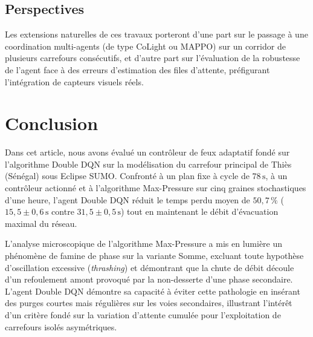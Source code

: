 \documentclass[11pt,a4paper]{article}
\begin{document}
\subsection{Perspectives}
Les extensions naturelles de ces travaux porteront d'une part sur le passage à une coordination multi-agents (de type CoLight ou MAPPO) sur un corridor de plusieurs carrefours consécutifs, et d'autre part sur l'évaluation de la robustesse de l'agent face à des erreurs d'estimation des files d'attente, préfigurant l'intégration de capteurs visuels réels.

\section{Conclusion}
\label{sec:conclusion}

Dans cet article, nous avons évalué un contrôleur de feux adaptatif fondé sur l'algorithme Double DQN sur la modélisation du carrefour principal de Thiès (Sénégal) sous Eclipse SUMO. Confronté à un plan fixe à cycle de $78\,\mathrm{s}$, à un contrôleur actionné et à l'algorithme Max-Pressure sur cinq graines stochastiques d'une heure, l'agent Double DQN réduit le temps perdu moyen de $50{,}7\,\%$ ($15{,}5 \pm 0{,}6\,\mathrm{s}$ contre $31{,}5 \pm 0{,}5\,\mathrm{s}$) tout en maintenant le débit d'évacuation maximal du réseau.

L'analyse microscopique de l'algorithme Max-Pressure a mis en lumière un phénomène de famine de phase sur la variante Somme, excluant toute hypothèse d'oscillation excessive (\emph{thrashing}) et démontrant que la chute de débit découle d'un refoulement amont provoqué par la non-desserte d'une phase secondaire. L'agent Double DQN démontre sa capacité à éviter cette pathologie en insérant des purges courtes mais régulières sur les voies secondaires, illustrant l'intérêt d'un critère fondé sur la variation d'attente cumulée pour l'exploitation de carrefours isolés asymétriques.
\end{document}
